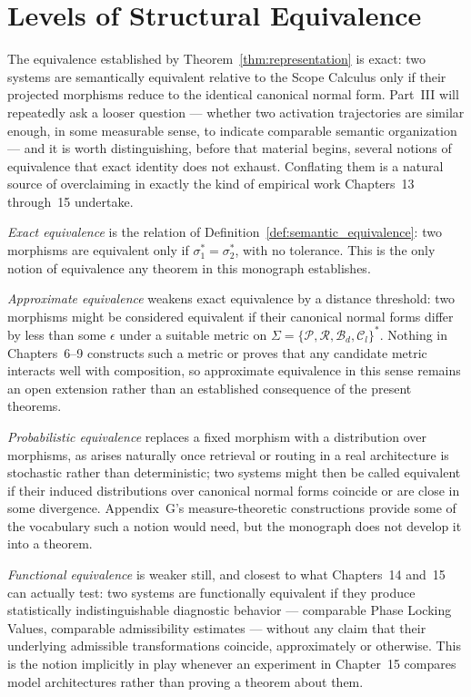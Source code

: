 \documentclass[11pt,twoside,openright]{book}
\numberwithin{equation}{chapter}
\theoremstyle{definition}
\theoremstyle{plain}
\theoremstyle{remark}
\theoremstyle{definition}
\newcommand{\ScopeMorph}{\sigma}
\newcommand{\Alphabet}{\Sigma}
\newcommand{\Pop}{\mathcal{P}}
\newcommand{\Refuse}{\mathcal{R}}
\newcommand{\Bind}{\mathcal{B}_d}
\newcommand{\Collapse}{\mathcal{C}_l}
\newcommand{\ScopeAlphabet}{\Alphabet=\{\Pop,\Refuse,\Bind,\Collapse\}}
\begin{document}
\section{Levels of Structural Equivalence}

The equivalence established by Theorem~\ref{thm:representation} is exact:
two systems are semantically equivalent relative to the Scope Calculus
only if their projected morphisms reduce to the identical canonical
normal form. Part~III will repeatedly ask a looser question --- whether
two activation trajectories are similar enough, in some measurable sense,
to indicate comparable semantic organization --- and it is worth
distinguishing, before that material begins, several notions of
equivalence that exact identity does not exhaust. Conflating them is a
natural source of overclaiming in exactly the kind of empirical work
Chapters~13 through~15 undertake.

\emph{Exact equivalence} is the relation of
Definition~\ref{def:semantic_equivalence}: two morphisms are equivalent
only if $\ScopeMorph_1^*=\ScopeMorph_2^*$, with no tolerance. This is the
only notion of equivalence any theorem in this monograph establishes.

\emph{Approximate equivalence} weakens exact equivalence by a distance
threshold: two morphisms might be considered equivalent if their
canonical normal forms differ by less than some $\epsilon$ under a
suitable metric on $\ScopeAlphabet^{*}$. Nothing in Chapters~6--9
constructs such a metric or proves that any candidate metric interacts
well with composition, so approximate equivalence in this sense remains
an open extension rather than an established consequence of the present
theorems.

\emph{Probabilistic equivalence} replaces a fixed morphism with a
distribution over morphisms, as arises naturally once retrieval or
routing in a real architecture is stochastic rather than deterministic;
two systems might then be called equivalent if their induced
distributions over canonical normal forms coincide or are close in some
divergence. Appendix~G's measure-theoretic constructions provide some of
the vocabulary such a notion would need, but the monograph does not
develop it into a theorem.

\emph{Functional equivalence} is weaker still, and closest to what
Chapters~14 and~15 can actually test: two systems are functionally
equivalent if they produce statistically indistinguishable diagnostic
behavior --- comparable Phase Locking Values, comparable admissibility
estimates --- without any claim that their underlying admissible
transformations coincide, approximately or otherwise. This is the notion
implicitly in play whenever an experiment in Chapter~15 compares model
architectures rather than proving a theorem about them.
\end{document}
